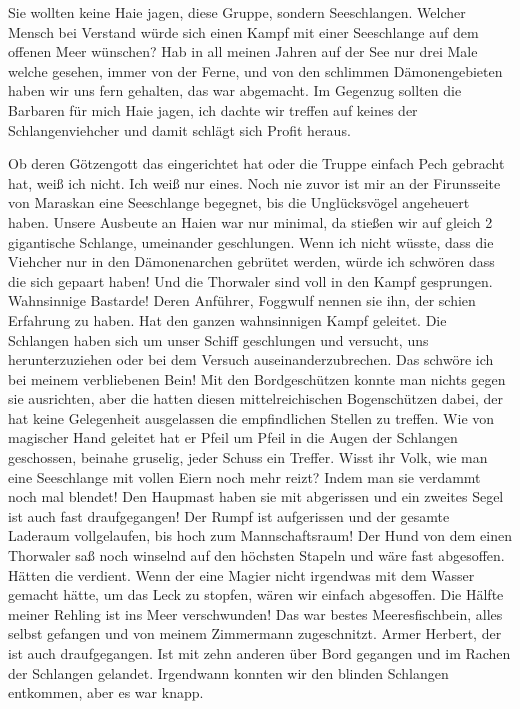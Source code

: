 \documentclass[final]{multiversum}
\begin{document}
Sie wollten keine Haie jagen, diese Gruppe, sondern Seeschlangen.
Welcher Mensch bei Verstand würde sich einen Kampf mit einer Seeschlange auf dem offenen Meer wünschen?
Hab in all meinen Jahren auf der See nur drei Male welche gesehen, immer von der Ferne, und von den schlimmen Dämonengebieten haben wir uns fern gehalten, das war abgemacht.
Im Gegenzug sollten die Barbaren für mich Haie jagen, ich dachte wir treffen auf keines der Schlangenviehcher und damit schlägt sich Profit heraus.

Ob deren Götzengott das eingerichtet hat oder die Truppe einfach Pech gebracht hat, weiß ich nicht.
Ich weiß nur eines.
Noch nie zuvor ist mir an der Firunsseite von Maraskan eine Seeschlange begegnet, bis die Unglücksvögel angeheuert haben.
Unsere Ausbeute an Haien war nur minimal, da stießen wir auf gleich 2 gigantische Schlange, umeinander geschlungen.
Wenn ich nicht wüsste, dass die Viehcher nur in den Dämonenarchen gebrütet werden, würde ich schwören dass die sich gepaart haben!
Und die Thorwaler sind voll in den Kampf gesprungen.
Wahnsinnige Bastarde!
Deren Anführer, Foggwulf nennen sie ihn, der schien Erfahrung zu haben. 
Hat den ganzen wahnsinnigen Kampf geleitet.
Die Schlangen haben sich um unser Schiff geschlungen und versucht, uns herunterzuziehen oder bei dem Versuch auseinanderzubrechen.
Das schwöre ich bei meinem verbliebenen Bein!
Mit den Bordgeschützen konnte man nichts gegen sie ausrichten, aber die hatten diesen mittelreichischen Bogenschützen dabei, der hat keine Gelegenheit ausgelassen die empfindlichen Stellen zu treffen.
Wie von magischer Hand geleitet hat er Pfeil um Pfeil in die Augen der Schlangen geschossen, beinahe gruselig, jeder Schuss ein Treffer.
Wisst ihr Volk, wie man eine Seeschlange mit vollen Eiern noch mehr reizt?
Indem man sie verdammt noch mal blendet!
Den Haupmast haben sie mit abgerissen und ein zweites Segel ist auch fast draufgegangen!
Der Rumpf ist aufgerissen und der gesamte Laderaum vollgelaufen, bis hoch zum Mannschaftsraum!
Der Hund von dem einen Thorwaler saß noch winselnd auf den höchsten Stapeln und wäre fast abgesoffen.
Hätten die verdient.
Wenn der eine Magier nicht irgendwas mit dem Wasser gemacht hätte, um das Leck zu stopfen, wären wir einfach abgesoffen.
Die Hälfte meiner Rehling ist ins Meer verschwunden!
Das war bestes Meeresfischbein, alles selbst gefangen und von meinem Zimmermann zugeschnitzt.
Armer Herbert, der ist auch draufgegangen. 
Ist mit zehn anderen über Bord gegangen und im Rachen der Schlangen gelandet.
Irgendwann konnten wir den blinden Schlangen entkommen, aber es war knapp.
\end{document}
